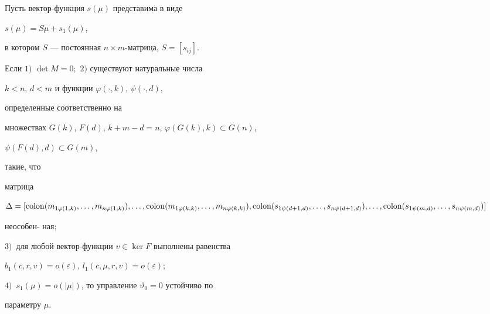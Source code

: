  


Пусть вектор-функция $s(\mu)$ представима в виде 


$s(\mu)=S\mu+s_1(\mu)$, 


в котором $S$ --- постоянная $n\times m$-матрица, $S=[s_{ij}]$. 


 


\begin{thm} 


Если $1)$ $\det M=0;$ $2)$ существуют натуральные числа 


$k<n$, $d<m$ и функции $\varphi(\cdot,k)$, $\psi(\cdot,d)$, 


определенные соответственно на 


множествах $G(k)$, $F(d)$, $k+m-d=n$, $\varphi(G(k),k)\subset G(n)$, 


$\psi(F(d),d)\subset G(m)$, 


такие, что 


матрица 


$\Delta=[\Colon(m_{1\varphi(1,k)},\dotsc,m_{n\varphi(1,k)}),


\dotsc, \linebreak


\Colon(m_{1\varphi(k,k)},\dotsc,m_{n\varphi(k,k)}), 


\Colon(s_{1\psi(d+1,d)},\dotsc,s_{n\psi(d+1,d)}),\dotsc, 


\Colon(s_{1\psi(m,d)},\dotsc,s_{n\psi(m,d)})]$ 


неособен- \linebreak ная$;$ 


$3)$~для любой вектор-функции $v\in\ker F$ выполнены равенства 


$b_1(c,r,v)=o(\varepsilon)$, $l_1(c,\mu,r,v)=o(\varepsilon);$ 


$4)$~$s_1(\mu)=o(|\mu|)$, то управление $\vartheta_0=0$ устойчиво по 


параметру $\mu$. 


\end{thm} 


 


